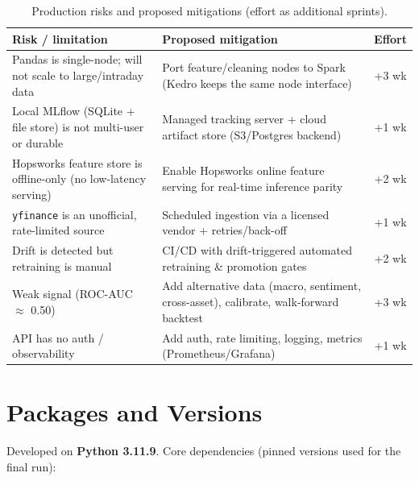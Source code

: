 \documentclass[12pt]{article}
\begin{document}
\vspace{-3pt}
\begin{table}[H]
\centering\small
\caption{Production risks and proposed mitigations (effort as additional sprints).}
\label{tab:risks}
\begin{tabularx}{\textwidth}{p{3.4cm}Xc}
\toprule
\textbf{Risk / limitation} & \textbf{Proposed mitigation} & \textbf{Effort} \\
\midrule
Pandas is single-node; will not scale to large/intraday data & Port feature/cleaning nodes to Spark (Kedro keeps the same node interface) & +3 wk \\
Local MLflow (SQLite + file store) is not multi-user or durable & Managed tracking server + cloud artifact store (S3/Postgres backend) & +1 wk \\
Hopsworks feature store is offline-only (no low-latency serving) & Enable Hopsworks online feature serving for real-time inference parity & +2 wk \\
\texttt{yfinance} is an unofficial, rate-limited source & Scheduled ingestion via a licensed vendor + retries/back-off & +1 wk \\
Drift is detected but retraining is manual & CI/CD with drift-triggered automated retraining \& promotion gates & +2 wk \\
Weak signal (ROC-AUC $\approx$ 0.50) & Add alternative data (macro, sentiment, cross-asset), calibrate, walk-forward backtest & +3 wk \\
API has no auth / observability & Add auth, rate limiting, logging, metrics (Prometheus/Grafana) & +1 wk \\
\bottomrule
\end{tabularx}
\end{table}

\section{Packages and Versions}

Developed on \textbf{Python 3.11.9}. Core dependencies (pinned versions used for the final run):
\end{document}
